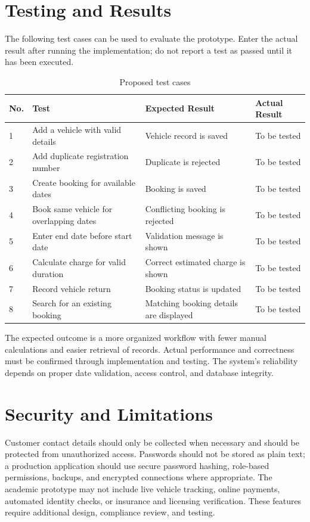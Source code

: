 \documentclass[11pt,a4paper]{report}
\begin{document}
\section{Testing and Results}
The following test cases can be used to evaluate the prototype. Enter the actual result after running the implementation; do not report a test as passed until it has been executed.

\begin{longtable}{|p{1cm}|p{4cm}|p{5cm}|p{3cm}|}
\caption{Proposed test cases}\\
\hline
\textbf{No.} & \textbf{Test} & \textbf{Expected Result} & \textbf{Actual Result}\\ \hline
1 & Add a vehicle with valid details & Vehicle record is saved & To be tested\\ \hline
2 & Add duplicate registration number & Duplicate is rejected & To be tested\\ \hline
3 & Create booking for available dates & Booking is saved & To be tested\\ \hline
4 & Book same vehicle for overlapping dates & Conflicting booking is rejected & To be tested\\ \hline
5 & Enter end date before start date & Validation message is shown & To be tested\\ \hline
6 & Calculate charge for valid duration & Correct estimated charge is shown & To be tested\\ \hline
7 & Record vehicle return & Booking status is updated & To be tested\\ \hline
8 & Search for an existing booking & Matching booking details are displayed & To be tested\\ \hline
\end{longtable}

The expected outcome is a more organized workflow with fewer manual calculations and easier retrieval of records. Actual performance and correctness must be confirmed through implementation and testing. The system's reliability depends on proper date validation, access control, and database integrity.

\section{Security and Limitations}
Customer contact details should only be collected when necessary and should be protected from unauthorized access. Passwords should not be stored as plain text; a production application should use secure password hashing, role-based permissions, backups, and encrypted connections where appropriate. The academic prototype may not include live vehicle tracking, online payments, automated identity checks, or insurance and licensing verification. These features require additional design, compliance review, and testing.
\end{document}
